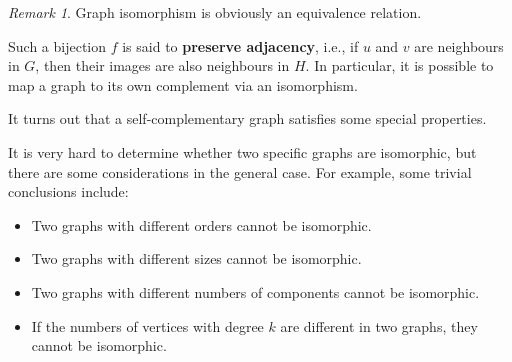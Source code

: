 \documentclass[math]{amznotes}
\makeatletter
\let\save@mathaccent\mathaccent
\newcommand*\if@single[3]{%
  \setbox0\hbox{${\mathaccent"0362{#1}}^H$}%
  \setbox2\hbox{${\mathaccent"0362{\kern0pt#1}}^H$}%
  \ifdim\ht0=\ht2 #3\else #2\fi
  }
\newcommand*\rel@kern[1]{\kern#1\dimexpr\macc@kerna}
\newcommand*\widebar[1]{\@ifnextchar^{{\wide@bar{#1}{0}}}{\wide@bar{#1}{1}}}
\newcommand*\wide@bar[2]{\if@single{#1}{\wide@bar@{#1}{#2}{1}}{\wide@bar@{#1}{#2}{2}}}
\newcommand*\wide@bar@[3]{%
  \begingroup
  \def\mathaccent##1##2{%
    \let\mathaccent\save@mathaccent
    \if#32 \let\macc@nucleus\first@char \fi
    \setbox\z@\hbox{$\macc@style{\macc@nucleus}_{}$}%
    \setbox\tw@\hbox{$\macc@style{\macc@nucleus}{}_{}$}%
    \dimen@\wd\tw@
    \advance\dimen@-\wd\z@
    \divide\dimen@ 3
    \@tempdima\wd\tw@
    \advance\@tempdima-\scriptspace
    \divide\@tempdima 10
    \advance\dimen@-\@tempdima
    \ifdim\dimen@>\z@ \dimen@0pt\fi
    \rel@kern{0.6}\kern-\dimen@
    \if#31
      \overline{\rel@kern{-0.6}\kern\dimen@\macc@nucleus\rel@kern{0.4}\kern\dimen@}%
      \advance\dimen@0.4\dimexpr\macc@kerna
      \let\final@kern#2%
      \ifdim\dimen@<\z@ \let\final@kern1\fi
      \if\final@kern1 \kern-\dimen@\fi
    \else
      \overline{\rel@kern{-0.6}\kern\dimen@#1}%
    \fi
  }%
  \macc@depth\@ne
  \let\math@bgroup\@empty \let\math@egroup\macc@set@skewchar
  \mathsurround\z@ \frozen@everymath{\mathgroup\macc@group\relax}%
  \macc@set@skewchar\relax
  \let\mathaccentV\macc@nested@a
  \if#31
    \macc@nested@a\relax111{#1}%
  \else
    \def\gobble@till@marker##1\endmarker{}%
    \futurelet\first@char\gobble@till@marker#1\endmarker
    \ifcat\noexpand\first@char A\else
      \def\first@char{}%
    \fi
    \macc@nested@a\relax111{\first@char}%
  \fi
  \endgroup
}
\theoremstyle{remark}
\newtheorem*{remark}{Remark}
\makeatother
\begin{document}
\begin{notebox}
    \begin{remark}
        Graph isomorphism is obviously an equivalence relation.
    \end{remark}
\end{notebox}
Such a bijection $f$ is said to \textbf{preserve adjacency}, i.e., if $u$ and $v$ are neighbours in $G$, then their images are also neighbours in $H$. In particular, it is possible to map a graph to its own complement via an isomorphism.
It turns out that a self-complementary graph satisfies some special properties.
It is very hard to determine whether two specific graphs are isomorphic, but there are some considerations in the general case. For example, some trivial conclusions include:
\begin{itemize}
    \item Two graphs with different orders cannot be isomorphic.
    \item Two graphs with different sizes cannot be isomorphic.
    \item Two graphs with different numbers of components cannot be isomorphic.
    \item If the numbers of vertices with degree $k$ are different in two graphs, they cannot be isomorphic.
\end{itemize}
\end{document}
